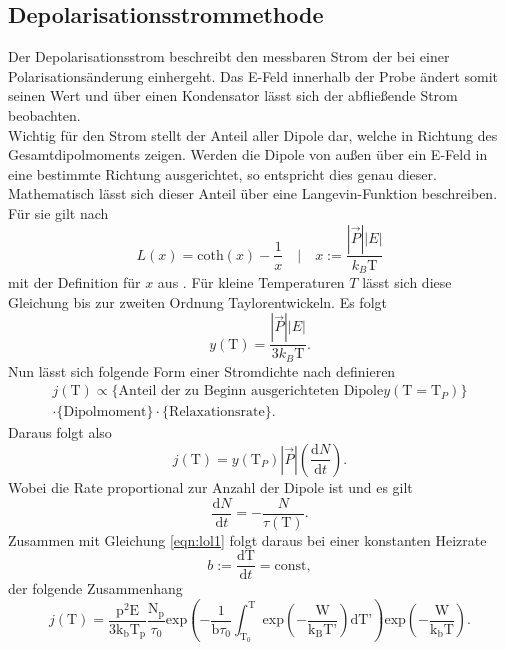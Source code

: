 \subsection{Depolarisationsstrommethode}
\label{sec:strom}
Der Depolarisationsstrom beschreibt den messbaren Strom der bei einer Polarisationsänderung einhergeht. Das E-Feld innerhalb der Probe ändert somit seinen Wert und über einen Kondensator lässt sich der abfließende Strom beobachten.
\\
Wichtig für den Strom stellt der Anteil aller Dipole dar, welche in Richtung des Gesamtdipolmoments zeigen. Werden die Dipole von außen über ein E-Feld in eine bestimmte Richtung ausgerichtet, so entspricht dies genau
dieser. Mathematisch lässt sich dieser Anteil über eine Langevin-Funktion beschreiben. Für sie gilt nach \cite{KROGER201577}
\begin{equation*}
L(x) = \text{coth}(x) - \frac{1}{x} \quad \Biggl| \quad x := \frac{|\vec{P}||E|}{k_{B} \text{T}}
\end{equation*}
mit der Definition für $x$ aus \cite{altskript}. Für kleine Temperaturen $T$ lässt sich diese Gleichung bis zur zweiten Ordnung Taylorentwickeln.
Es folgt
\begin{equation*}
y(\text{T}) = \frac{|\vec{P}||E|}{3k_{B} \text{T}}.
\end{equation*}
Nun lässt sich folgende Form einer Stromdichte nach \cite{Fuller} definieren
\begin{multline}
j(\text{T}) \propto \{\text{Anteil der zu Beginn ausgerichteten Dipole} y(\text{T} = \text{T}_P)\} \\ \cdot \{\text{Dipolmoment}\} \cdot \{\text{Relaxationsrate}\}.
\end{multline}
Daraus folgt also
\begin{equation*}
j(\text{T}) = y(\text{T}_P) |\vec{P}| \left(\frac{\text{d}N}{\text{d}t}\right).
\end{equation*}
Wobei die Rate proportional zur Anzahl der Dipole ist und es gilt
\begin{equation*}
    \frac{\text{d}N}{\text{d}t} = - \frac{N}{\tau(\text{T})}.
\end{equation*}
Zusammen mit Gleichung \eqref{eqn:lol1} folgt daraus bei einer konstanten Heizrate 
\begin{equation*}
b := \frac{\text{dT}}{\text{d}t} = \text{const},
\end{equation*}
der folgende Zusammenhang
\begin{equation}
    j \left( \text{T} \right) = \frac{\text{p}^2 \text{E}}{3\text{k}_{\text{b}}\text{T}_{\text{p}}} \frac{\text{N}_{\text{p}}}{\tau_0} \text{exp} \left( -\frac{1}{\text{b}\tau_0} \int^{\text{T}}_{\text{T}_0}  \text{exp} \left( - \frac{\text{W}}{\text{k}_{\text{B}}\text{T'}} \right) \text{dT'} \right) \text{exp} \left(-\frac{\text{W}}{\text{k}_{\text{b}}\text{T}} \right).
    \label{killme}
\end{equation}
